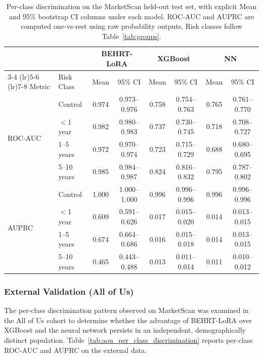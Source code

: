 \documentclass[12pt]{article}
\begin{document}
\begin{table}[H]
\centering
\caption{Per-class discrimination on the MarketScan held-out test set, with explicit Mean and 95\% bootstrap CI columns under each model. ROC-AUC and AUPRC are computed one-vs-rest using raw probability outputs. Risk classes follow Table~\ref{tab:groups}.}
\label{tab:per_class_discrimination_alt2}
\setlength{\tabcolsep}{4pt}
\begin{tabular}{ll cc cc cc}
\toprule
 & & \multicolumn{2}{c}{BEHRT-LoRA} & \multicolumn{2}{c}{XGBoost} & \multicolumn{2}{c}{NN} \\
\cmidrule(lr){3-4} \cmidrule(lr){5-6} \cmidrule(lr){7-8}
Metric & Risk Class & Mean & 95\% CI & Mean & 95\% CI & Mean & 95\% CI \\
\midrule
\multirow{4}{*}{ROC-AUC}
 & Control     & 0.974 & 0.973--0.976 & 0.758 & 0.754--0.763 & 0.765 & 0.761--0.770 \\
 & $<$1 year   & 0.982 & 0.980--0.983 & 0.737 & 0.730--0.745 & 0.718 & 0.708--0.727 \\
 & 1--5 years  & 0.972 & 0.970--0.974 & 0.723 & 0.715--0.729 & 0.688 & 0.680--0.695 \\
 & 5--10 years & 0.985 & 0.984--0.987 & 0.824 & 0.816--0.832 & 0.795 & 0.787--0.802 \\
\midrule
\multirow{4}{*}{AUPRC}
 & Control     & 1.000 & 1.000--1.000 & 0.996 & 0.996--0.996 & 0.996 & 0.996--0.996 \\
 & $<$1 year   & 0.609 & 0.591--0.626 & 0.017 & 0.015--0.020 & 0.014 & 0.013--0.015 \\
 & 1--5 years  & 0.674 & 0.664--0.686 & 0.016 & 0.015--0.018 & 0.014 & 0.013--0.015 \\
 & 5--10 years & 0.465 & 0.443--0.488 & 0.013 & 0.011--0.014 & 0.011 & 0.010--0.012 \\
\bottomrule
\end{tabular}
\end{table}

\subsubsection{External Validation (All of Us)}

The per-class discrimination pattern observed on MarketScan was examined in the All of Us cohort to determine whether the advantage of BEHRT-LoRA over XGBoost and the neural network persists in an independent, demographically distinct population. Table~\ref{tab:aou_per_class_discrimination} reports per-class ROC-AUC and AUPRC on the external data.
\end{document}
